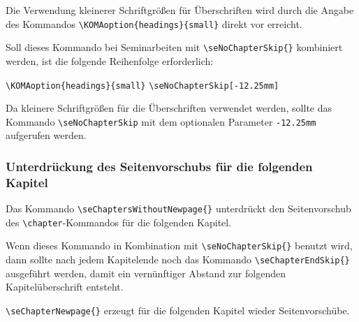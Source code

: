 Die Verwendung kleinerer Schriftgr\"o{\ss}en f\"ur \"Uberschriften wird durch 
die Angabe des Kommandos \verb+\KOMAoption{headings}{small}+ direkt 
vor \verb++ erreicht.

Soll dieses Kommando bei Seminarbeiten mit \verb+\seNoChapterSkip{}+ kombiniert 
werden, ist die folgende Reihenfolge erforderlich:

\begin{seList}
\item[] \verb+\KOMAoption{headings}{small}+\newline
\verb+\seNoChapterSkip[-12.25mm]+\newline
\verb++
\end{seList}

Da kleinere Schriftgr\"o{\ss}en f\"ur die \"Uberschriften verwendet werden, sollte das Kommando \verb+\seNoChapterSkip+ mit 
dem optionalen Parameter \texttt{-12.25mm} aufgerufen werden.

\subsubsection{Unterdr\"uckung des Seitenvorschubs f\"ur die folgenden Kapitel}

Das Kommando \verb+\seChaptersWithoutNewpage{}+ unterdr\"uckt den Seitenvorschub des \verb+\chapter+-Kom\-man\-dos f\"ur die folgenden Kapitel. 

Wenn dieses Kommando in Kombination mit \verb+\seNoChapterSkip{}+ benutzt wird, dann sollte nach jedem Kapitelende noch das Kommando 
\verb+\seChapterEndSkip{}+ ausgef\"uhrt werden, damit ein vern\"unftiger Abstand zur folgenden Kapitel\"uberschrift entsteht.

\verb+\seChapterNewpage{}+ erzeugt f\"ur die folgenden Kapitel wieder Seitenvorsch\"ube.

